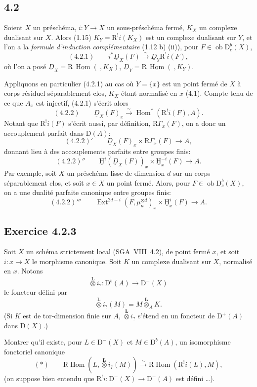 \documentclass[11pt]{article}
\providecommand{\uH}{\underline{\mathrm H}}
\DeclareMathOperator{\Hom}{Hom}
\DeclareMathOperator{\Ext}{Ext}
\newcommand{\R}{\mathrm{R}}
\newcommand{\D}{\mathrm{D}}
\newcommand{\ob}{\operatorname{ob}}
\providecommand{\Hom}{\operatorname{Hom}}
\providecommand{\ob}{\operatorname{ob}}
\begin{document}
\subsection*{4.2}
Soient $X$ un préschéma, $i:Y\to X$ un sous-préschéma fermé, $K_X$ un complexe dualisant sur $X$. Alors (1.15) $K_Y=\R^{!}i(K_X)$ est un complexe dualisant sur $Y$, et l'on a la \emph{formule d'induction complémentaire} (1.12 b) (ii)), pour $F\in \ob\D_c^b(X)$,
\[
(4.2.1)\qquad i^*\underline{D}_X(F)\xrightarrow{\sim}\underline{D}_Y\R^{!}i(F),
\]
où l'on a posé $\underline{D}_X=\R\,\underline{\Hom}(\ ,K_X)$, $\underline{D}_Y=\R\,\underline{\Hom}(\ ,K_Y)$.

Appliquons en particulier (4.2.1) au cas où $Y=\{x\}$ est un point fermé de $X$ à corps résiduel séparablement clos, $K_X$ étant normalisé en $x$ (4.1). Compte tenu de ce que $A_x$ est injectif, (4.2.1) s'écrit alors
\[
(4.2.2)\qquad \underline{D}_X(F)_x\xrightarrow{\sim}\Hom^*(\R^{!}i(F),A).
\]
Notant que $\R^{!}i(F)$ s'écrit aussi, par définition, $\R\Gamma_x(F)$, on a donc un accouplement parfait dans $\D(A)$:
\[
(4.2.2)'\qquad \underline{D}_X(F)_x\times \R\Gamma_x(F)\longrightarrow A,
\]
donnant lieu à des accouplements parfaits entre groupes finis:
\[
(4.2.2)''\qquad \uH^i(\underline{D}_X(F))_x\times \uH_x^{-i}(F)\longrightarrow A.
\]
Par exemple, soit $X$ un préschéma lisse de dimension $d$ sur un corps séparablement clos, et soit $x\in X$ un point fermé. Alors, pour $F\in\ob\D_c^b(X)$, on a une dualité parfaite canonique entre groupes finis:
\[
(4.2.2)'''\qquad \Ext^{2d-i}(F,\mu_n^{\otimes d})_x\times \uH_x^i(F)\longrightarrow A.
\]

\subsection*{Exercice 4.2.3}
Soit $X$ un schéma strictement local (SGA~VIII~4.2), de point fermé $x$, et soit $i:x\to X$ le morphisme canonique. Soit $K$ un complexe dualisant sur $X$, normalisé en $x$. Notons
\[
\overset{\mathbf L}{\otimes} i_? : \D^b(A)\longrightarrow \D^-(X)
\]
le foncteur défini par
\[
\overset{\mathbf L}{\otimes} i_?(M)=M\overset{\mathbf L}{\otimes}_A K.
\]
(Si $K$ est de tor-dimension finie sur $A$, $\overset{\mathbf L}{\otimes} i_?$ s'étend en un foncteur de $\D^+(A)$ dans $\D(X)$.)

Montrer qu'il existe, pour $L\in\D^-(X)$ et $M\in\D^b(A)$, un isomorphisme fonctoriel canonique
\[
(*)\qquad \R\Hom(L,\overset{\mathbf L}{\otimes} i_?(M))\xrightarrow{\sim}\R\Hom(\R^{!}i(L),M),
\]
(on suppose bien entendu que $\R^{!}i:\D^-(X)\to\D^-(A)$ est défini \dots).
\end{document}
